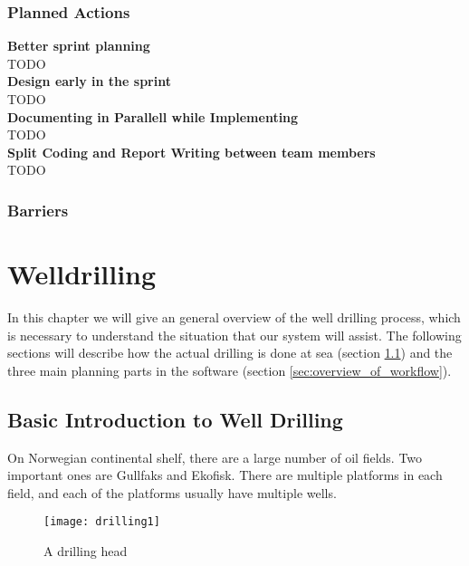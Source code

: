 \documentclass{report}
\begin{document}
\subsection{Planned Actions} \label{subsec:planned_act}
\textbf{Better sprint planning}\\
TODO\\
\textbf{Design early in the sprint}\\
TODO\\
\textbf{Documenting in Parallell while Implementing}\\
TODO\\
\textbf{Split Coding and Report Writing between team members}\\
TODO
\subsection{Barriers} \label{subsec:barriers}

















\appendix
\chapter{Welldrilling} \label{cha:welldrilling}
In this chapter we will give an general overview of the well drilling process, which is necessary to understand the situation that our system will assist. The following sections will describe how the actual drilling is done at sea (section \ref{sec:basic_introduction_to_well_drilling}) and the three main planning parts in the software (section \ref{sec:overview_of_workflow}).



\section{Basic Introduction to Well Drilling} \label{sec:basic_introduction_to_well_drilling}
On Norwegian continental shelf, there are a large number of oil fields. Two important ones are Gullfaks and Ekofisk. There are multiple platforms in each field, and each of the platforms usually have multiple wells.


\begin{wrapfigure}{R}{0.5\textwidth}
    \centering
    \texttt{[image: drilling1]}
    \caption{A drilling head \label{fig:drillinghead}}
\end{wrapfigure}
\end{document}
